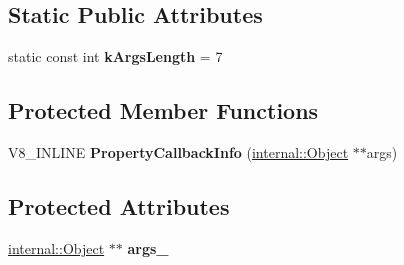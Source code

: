 \subsection*{Static Public Attributes}
\begin{DoxyCompactItemize}
\item 
static const int {\bfseries k\+Args\+Length} = 7\hypertarget{classv8_1_1_property_callback_info_a9fc9663a2e23f9324fe61f92d1e7e5b5}{}\label{classv8_1_1_property_callback_info_a9fc9663a2e23f9324fe61f92d1e7e5b5}

\end{DoxyCompactItemize}
\subsection*{Protected Member Functions}
\begin{DoxyCompactItemize}
\item 
V8\+\_\+\+I\+N\+L\+I\+NE {\bfseries Property\+Callback\+Info} (\hyperlink{classv8_1_1internal_1_1_object}{internal\+::\+Object} $\ast$$\ast$args)\hypertarget{classv8_1_1_property_callback_info_aa666043c86d4db9a57a3ac866c78ee0e}{}\label{classv8_1_1_property_callback_info_aa666043c86d4db9a57a3ac866c78ee0e}

\end{DoxyCompactItemize}
\subsection*{Protected Attributes}
\begin{DoxyCompactItemize}
\item 
\hyperlink{classv8_1_1internal_1_1_object}{internal\+::\+Object} $\ast$$\ast$ {\bfseries args\+\_\+}\hypertarget{classv8_1_1_property_callback_info_a57b2243627071c62ed3900a741a41a0b}{}\label{classv8_1_1_property_callback_info_a57b2243627071c62ed3900a741a41a0b}

\end{DoxyCompactItemize}
